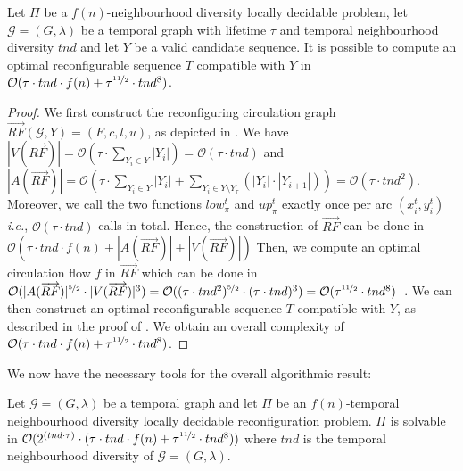 \begin{lemmarep}
  \label{lemma:compute reconfigurable sequence} Let $\Pi$ be a $f(n)$-neighbourhood diversity locally decidable problem, let $\mathcal{G}=(G,\lambda)$ be a temporal graph with lifetime $\tau$ and temporal neighbourhood diversity $tnd$ and let $Y$ be a valid candidate sequence. It is possible to compute an optimal reconfigurable sequence $T$ compatible with $Y$ in
$\mathcal{O}(\tau\cdot tnd \cdot f(n) + \tau^{\nicefrac{11}{2}} \cdot tnd^8)$.
\end{lemmarep}

\begin{proof}
  We first construct the reconfiguring circulation graph $\overrightarrow{RF}(\mathcal{G},Y)=(F,c,l,u)$, as depicted in . We have $|V(\overrightarrow{RF})|=\mathcal{O}(\tau\cdot \sum\limits_{Y_i \in Y}|Y_i|) = \mathcal{O}(\tau \cdot tnd)$ and $|A(\overrightarrow{RF})|= \mathcal{O}(\tau \cdot \sum\limits_{Y_i \in Y}|Y_i| + \sum\limits_{Y_i \in Y \setminus Y_\tau}(|Y_i|\cdot |Y_{i+1}|)) = \mathcal{O}(\tau \cdot tnd^2)$. Moreover, we call the two functions $low^t_\pi$ and $up^t_\pi$ exactly once per arc $(x^t_i,y^t_i)$ \textit{i.e.}, $\mathcal{O}(\tau\cdot tnd)$ calls in total. Hence,  the construction of $\overrightarrow{RF}$ can be done in $\mathcal{O}(\tau\cdot tnd \cdot f(n) + |A(\overrightarrow{RF})| + |V(\overrightarrow{RF})|)$
  Then, we compute an optimal circulation flow $f$ in $\overrightarrow{RF}$ which can be done in $\mathcal{O}(|A(\overrightarrow{RF})|^{\nicefrac{5}{2}} \cdot |V(\overrightarrow{RF})|^3) = \mathcal{O}((\tau\cdot tnd^2)^{\nicefrac{5}{2}}\cdot (\tau\cdot tnd)^3) = \mathcal{O}(\tau^{\nicefrac{11}{2}}\cdot tnd^8)$~\cite{Tardos85}. We can then construct an optimal reconfigurable sequence $T$ compatible with $Y$, as described in the proof of . We obtain an overall complexity of $\mathcal{O}(\tau\cdot tnd \cdot f(n) + \tau^{\nicefrac{11}{2}} \cdot tnd^8)$.
\end{proof}

We now have the necessary tools for the overall algorithmic result:

\begin{lemmarep}   \label{lemma:fpt nd}
  Let $\mathcal{G}=(G,\lambda)$ be a temporal graph and let $\Pi$ be an $f(n)$-temporal neighbourhood diversity locally decidable reconfiguration problem. 
 $\Pi$ is solvable in $\mathcal{O}(2^{(tnd\cdot \tau)} \cdot (\tau\cdot tnd \cdot f(n) + \tau^{\nicefrac{11}{2}} \cdot tnd^8))$ where $tnd$ is the temporal neighbourhood diversity of $\mathcal{G}=(G,\lambda)$.
\end{lemmarep}

